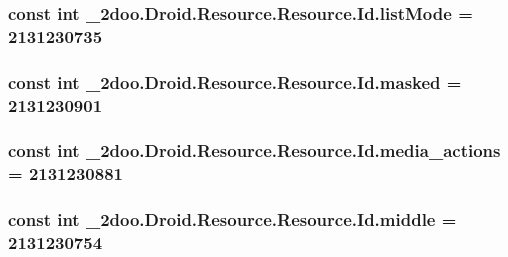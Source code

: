 \hypertarget{class__2doo_1_1_droid_1_1_resource_1_1_id_2ca23032296e40b604e1139e5d493621}{
\subsubsection[{listMode}]{\setlength{\rightskip}{0pt plus 5cm}const int \_\-2doo.Droid.Resource.Resource.Id.listMode = 2131230735}}
\label{class__2doo_1_1_droid_1_1_resource_1_1_id_2ca23032296e40b604e1139e5d493621}


\hypertarget{class__2doo_1_1_droid_1_1_resource_1_1_id_56d5051cf64324573bc75fe1f0fa7188}{
\subsubsection[{masked}]{\setlength{\rightskip}{0pt plus 5cm}const int \_\-2doo.Droid.Resource.Resource.Id.masked = 2131230901}}
\label{class__2doo_1_1_droid_1_1_resource_1_1_id_56d5051cf64324573bc75fe1f0fa7188}


\hypertarget{class__2doo_1_1_droid_1_1_resource_1_1_id_519bba8243fb800c73aca582c704e8f8}{
\subsubsection[{media\_\-actions}]{\setlength{\rightskip}{0pt plus 5cm}const int \_\-2doo.Droid.Resource.Resource.Id.media\_\-actions = 2131230881}}
\label{class__2doo_1_1_droid_1_1_resource_1_1_id_519bba8243fb800c73aca582c704e8f8}


\hypertarget{class__2doo_1_1_droid_1_1_resource_1_1_id_a592f9c83095817a8a7b9f88dffd3654}{
\subsubsection[{middle}]{\setlength{\rightskip}{0pt plus 5cm}const int \_\-2doo.Droid.Resource.Resource.Id.middle = 2131230754}}
\label{class__2doo_1_1_droid_1_1_resource_1_1_id_a592f9c83095817a8a7b9f88dffd3654}


